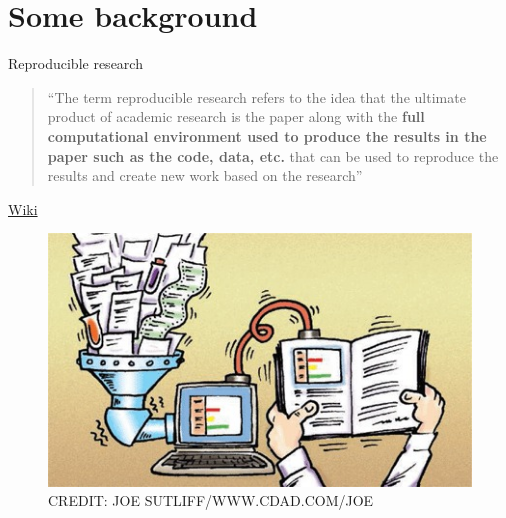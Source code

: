 \section{Some background}\label{some-background}

\begin{frame}{Reproducible research}

\begin{quote}
``The term reproducible research refers to the idea that the ultimate
product of academic research is the paper along with the \textbf{full
computational environment used to produce the results in the paper such
as the code, data, etc.} that can be used to reproduce the results and
create new work based on the research''
\end{quote}

\raggedleft 

\href{https://en.wikipedia.org/wiki/Reproducibility\#Reproducible_research}{Wiki}

\begin{figure}
\centering
\includegraphics[width=.5\linewidth]{F1-large.jpg}\\
\footnotesize CREDIT: JOE SUTLIFF/WWW.CDAD.COM/JOE
\end{figure}

\end{frame}

